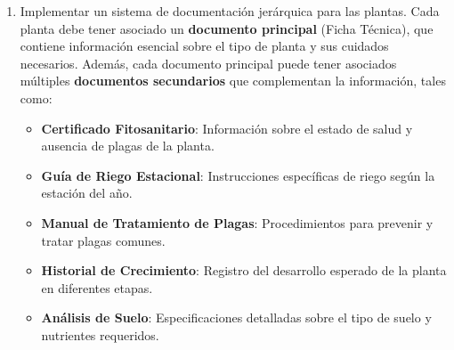 \documentclass[10pt]{article}
\begin{document}
\begin{enumerate}
		\begin{enumerate}
			\item Modificar el diseño de la base de datos relacional para permitir conversaciones en los comentarios, es decir, permitir que los usuarios puedan responder comentarios de otros usuarios creando hilos (conversaciones internas).

			\begin{itemize}
				\item Escribir el código para modificar la base de datos de acuerdo al diseño y generar conversaciones de prueba de longitud no menor que 20.

				\item Escribir código para dado un comentario inicial obtener la conversación entera surgida a partir de dicho comentario.
			\end{itemize}

			\item Modelar y resolver el mismo problema de conversaciones en comentarios utilizando otro modelo de datos visto en conferencias. Los identificadores de los comentarios deben ser los mismos en ambas bases de datos para facilitar la comparación.

			\item Comparar ambos diseños (relacional y no relacional) de acuerdo a las ventajas y desventajas que presentan para resolver este escenario.
		\end{enumerate}

		\item Implementar un sistema de documentación jerárquica para las plantas. Cada planta debe tener asociado un \textbf{documento principal} (Ficha Técnica), que contiene información esencial sobre el tipo de planta y sus cuidados necesarios. Además, cada documento principal puede tener asociados múltiples \textbf{documentos secundarios} que complementan la información, tales como:

		\begin{itemize}
			\item \textbf{Certificado Fitosanitario}: Información sobre el estado de salud y ausencia de plagas de la planta.
			\item \textbf{Guía de Riego Estacional}: Instrucciones específicas de riego según la estación del año.
			\item \textbf{Manual de Tratamiento de Plagas}: Procedimientos para prevenir y tratar plagas comunes.
			\item \textbf{Historial de Crecimiento}: Registro del desarrollo esperado de la planta en diferentes etapas.
			\item \textbf{Análisis de Suelo}: Especificaciones detalladas sobre el tipo de suelo y nutrientes requeridos.
		\end{itemize}


\end{enumerate}
\end{document}
